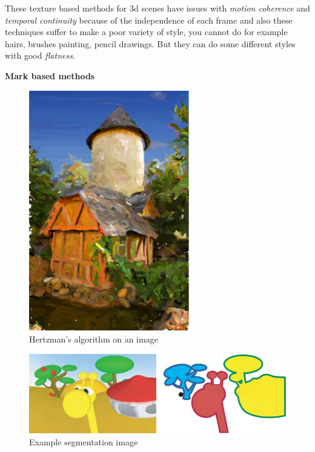 These texture based methods for 3d scenes have issues with \textit{motion coherence} and \textit{temporal continuity} because of the independence of each frame and also these techniques suffer to make a poor variety of style, you cannot do for example hairs, brushes painting, pencil drawings. But they can do some different styles with good \textit{flatness}.\newline

\textbf{Mark based methods}

\begin{figure}
    \begin{center}

    \includegraphics[scale=0.5]{pics/hertzmann_algo.png}
    \end{center}
    \caption{Hertzman's algorithm on an image \cite{rosin_stroke_2013}}
    \label{Hertzman_algo}
\end{figure}

\begin{figure}
    \begin{center}

    \includegraphics[scale=0.5]{pics/segmentation_example.png}
    \end{center}
    \caption{Example segmentation image\cite{benard_state---art_2011}}
    \label{segmenation_example}
\end{figure}

